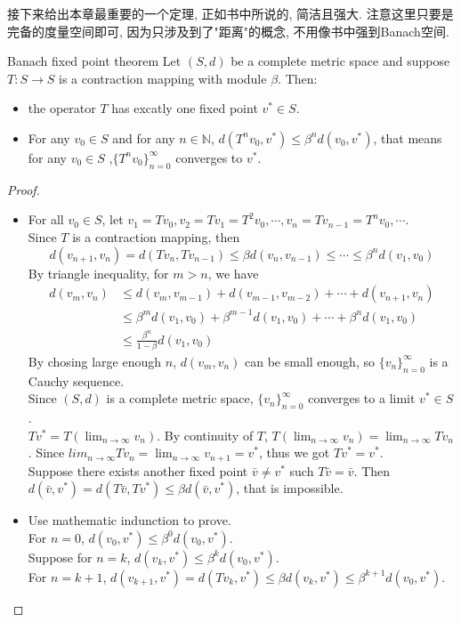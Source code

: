 接下来给出本章最重要的一个定理, 正如书中所说的, 简洁且强大.
注意这里只要是完备的度量空间即可, 因为只涉及到了"距离"的概念, 不用像书中强到Banach空间.
\begin{theorem}{Banach fixed point theorem}
    Let $(S,d)$ be a complete metric space and suppose $T:S\to S$ is a contraction mapping with module $\beta$. Then:
    \begin{itemize}
        \item the operator $T$ has excatly one fixed point $v^*\in S$.
        \item For any $v_0\in S$ and for any $n\in\mathbb{N}$, $d(T^nv_0,v^*)\leq \beta^nd(v_0,v^*)$, that means for any $v_0\in S$ ,$\{T^nv_0\}_{n=0}^{\infty}$ converges to $v^*$.
    \end{itemize}
\end{theorem}
\begin{proof}
    \begin{itemize}
        \item For all $v_0\in S$, let $v_1=Tv_0,v_2=Tv_1=T^2v_0,\cdots,v_n=Tv_{n-1}=T^nv_0,\cdots$.\\
        Since $T$ is a contraction mapping, then 
        $$d(v_{n+1},v_n)=d(Tv_n,Tv_{n-1})\leq \beta d(v_n,v_{n-1})\leq \cdots \leq \beta^n d(v_1,v_0)$$
        By triangle inequality, for $m>n$, we have
        $$
        \begin{aligned}
            d(v_m,v_n) & \leq d(v_m,v_{m-1}) + d(v_{m-1},v_{m-2}) + \cdots + d(v_{n+1},v_n) \\
            & \leq \beta^{m}d(v_1,v_0) + \beta^{m-1}d(v_1,v_0) + \cdots + \beta^n d(v_1,v_0) \\
            & \leq \frac{\beta^n}{1-\beta}d(v_1,v_0)
            \end{aligned}$$
        By chosing large enough $n$, $d(v_m,v_n)$ can be small enough, so $\{v_n\}_{n=0}^{\infty}$ is a Cauchy sequence.\\
        Since $(S,d)$ is a complete metric space, $\{v_n\}_{n=0}^{\infty}$ converges to a limit $v^*\in S$.\\
        $Tv^*=T(\lim_{n\to\infty}v_n)$. By continuity of $T$, $T(\lim_{n\to\infty}v_n)=\lim_{n\to\infty}Tv_n$.
        Since $lim_{n\to\infty}Tv_n=\lim_{n\to\infty}v_{n+1}=v^*$, thus we got $Tv^*=v^*$.\\
        Suppose there exists another fixed point $\bar{v}\neq v^*$ such $T\bar{v}=\bar{v}$.
        Then $d(\bar{v},v^*)=d(T\bar{v},Tv^*)\leq \beta d(\bar{v},v^*)$, that is impossible.
        \item Use mathematic indunction to prove.\\
        For $n=0$, $d(v_0,v^*)\leq \beta^0 d(v_0,v^*)$.\\
        Suppose for $n=k$, $d(v_k,v^*)\leq \beta^k d(v_0,v^*)$.\\
        For $n=k+1$, $d(v_{k+1},v^*)=d(Tv_k,v^*)\leq \beta d(v_k,v^*)\leq \beta^{k+1}d(v_0,v^*)$.\\
    \end{itemize}
\end{proof}
\newpage


